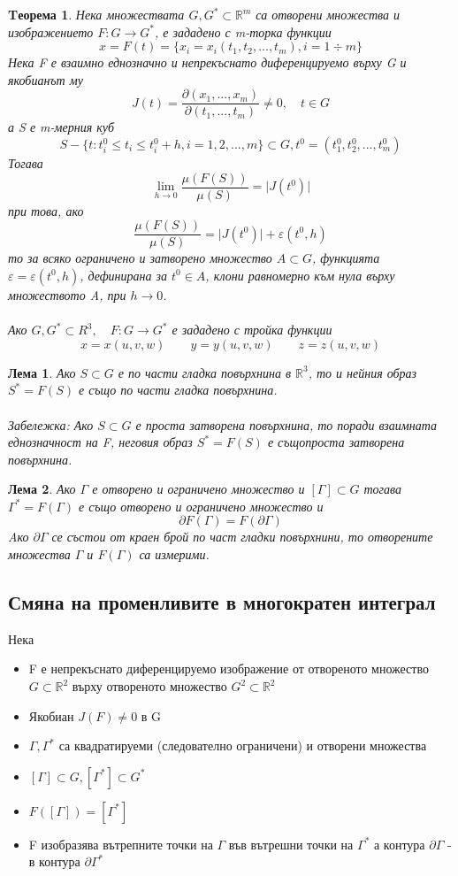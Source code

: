 \documentclass[a4paper,fleqn,12pt]{article}
\newtheorem{theorem}{Tеорема}[subsection]
\newtheorem{lemma}{Лема}[subsection]
\theoremstyle{definition}
\begin{document}
\begin{theorem}
Нека множествата $G, G^* \subset \mathbb{R}^m$ са отворени множества и изображението $F: G \to G^*$, е зададено с m-торка функции
$$x = F(t) = \{x_i = x_i(t_1,t_2, ..., t_m), i = 1 \div m \}$$
Нека F е взаимно еднозначно и непрекъснато диференцируемо върху G и якобианът му
$$J(t) = \frac{\partial (x_1, ..., x_m)}{\partial (t_1, ..., t_m)} \neq 0, \quad t \in G$$
а S е m-мерния куб
$$S - \{t: t_i ^0 \leq t_i \leq t_i ^ 0 + h, i = 1, 2, ..., m \} \subset G, t^0 = (t_1 ^0, t_2 ^0, ..., t_m ^0)$$
Тогава 
$$\lim\limits_{h \to 0} \frac{\mu(F(S))}{\mu(S)} = \vert J(t^0)\vert  $$
при това, ако 
$$\frac{\mu(F(S))}{\mu(S)} = \vert J(t^0)\vert + \varepsilon (t^0, h)$$
то за всяко ограничено и затворено множество $A \subset G$, функцията $\varepsilon = \varepsilon (t^0,h)$, дефинирана за $t^0 \in A$, клони равномерно към нула върху множеството A, при $h \to 0$.
\\
\\
Ако $G,G^* \subset{R}^3, \quad F:G \to G^*$ е зададено с тройка функции
$$x= x(u,v,w) \qquad y= y(u,v,w) \qquad  z= z(u,v,w) $$
\end{theorem}

\begin{lemma}
Ако $S \subset G$ е по части гладка повърхнина в $\mathbb{R}^3$, то и нейния образ $S^* = F(S)$ е също по части гладка повърхнина. 
\\
\\
Забележка: Ако $S \subset G$ е проста затворена повърхнина, то поради взаимната еднозначност на F, неговия образ $S^* = F(S)$ е същопроста затворена повърхнина. 
\end{lemma}

\begin{lemma}
Ако $\Gamma$ е отворено и ограничено множество и $[\Gamma] \subset G$ тогава $\Gamma^* = F(\Gamma)$ е също отворено и ограничено множество и 
$$\partial F(\Gamma) = F(\partial \Gamma)$$
Aко $\partial \Gamma$ се състои от краен брой по част гладки повърхнини, то отворените множества $\Gamma$ и $F(\Gamma)$ са измерими. 
\end{lemma}

\newpage
\subsection{Смяна на променливите в многократен интеграл}
Нека
\begin{itemize}
\item F е непрекъснато диференцируемо изображение от отвореното множество $G \subset \mathbb{R}^2$ върху отвореното множество $G^2 \subset \mathbb{R}^2$
\item Якобиан $J(F) \neq 0$ в G
\item $\Gamma, \Gamma^*$ са квадратируеми (следователно ограничени) и отворени множества 
\item $[\Gamma] \subset G, [\Gamma^*] \subset G^*$
\item $F([\Gamma]) = [\Gamma^*]$
\item F изобразява вътрепните точки на $\Gamma$ във вътрешни точки на $\Gamma^*$ а контура $\partial \Gamma$ - в контура $\partial \Gamma^*$
\end{itemize}
\end{document}
